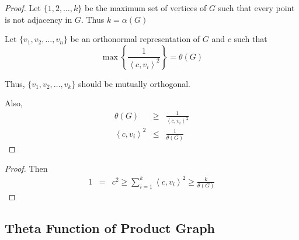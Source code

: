       \begin{frame}
            \begin{proof}
                  Let $ \{1,2,\dots,k\} $ be the maximum set of vertices of $ G $ such that every point is not adjacency in $ G $. Thus $ k = \alpha(G) $
      
                  Let $ \{v_1, v_2, \dots, v_n\} $ be an orthonormal representation of $ G $ and $ c $ such that
                  \begin{equation}
                        \max \left\{ \frac{1}{\left<c,v_{i}\right>^2} \right\} = \theta(G)
                  \end{equation}

                  Thus, $\{v_{1},v_{2},\hdots,v_{k}\}$ should be mutually orthogonal.

                  Also,
                  \begin{eqnarray}
                        \theta(G) &\ge& \frac{1}{\left<c,v_{i}\right>^2} \\
                        \left<c,v_{i}\right>^2 &\le& \frac{1}{\theta(G)}
                  \end{eqnarray}
            \end{proof}
      \end{frame}

      \begin{frame}
            \begin{proof}
                  Then
                  \begin{eqnarray}
                        1 &=& c^{2}
                        \geq \sum_{i=1}^{k} \left<c,v_{i}\right>^{2}
                        \geq \frac{k}{\theta(G)}
                  \end{eqnarray}
            \end{proof}
      \end{frame}

\subsection{Theta Function of Product Graph}

